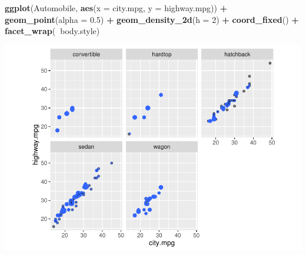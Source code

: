 \documentclass[]{article}
\newenvironment{Shaded}{\begin{snugshade}}{\end{snugshade}}
\newcommand{\KeywordTok}[1]{\textcolor[rgb]{0.13,0.29,0.53}{\textbf{#1}}}
\newcommand{\DataTypeTok}[1]{\textcolor[rgb]{0.13,0.29,0.53}{#1}}
\newcommand{\DecValTok}[1]{\textcolor[rgb]{0.00,0.00,0.81}{#1}}
\newcommand{\FloatTok}[1]{\textcolor[rgb]{0.00,0.00,0.81}{#1}}
\newcommand{\StringTok}[1]{\textcolor[rgb]{0.31,0.60,0.02}{#1}}
\newcommand{\CommentTok}[1]{\textcolor[rgb]{0.56,0.35,0.01}{\textit{#1}}}
\newcommand{\ControlFlowTok}[1]{\textcolor[rgb]{0.13,0.29,0.53}{\textbf{#1}}}
\newcommand{\OperatorTok}[1]{\textcolor[rgb]{0.81,0.36,0.00}{\textbf{#1}}}
\newcommand{\NormalTok}[1]{#1}
\begin{document}
\begin{Shaded}
\begin{Highlighting}[]
\KeywordTok{ggplot}\NormalTok{(Automobile, }\KeywordTok{aes}\NormalTok{(}\DataTypeTok{x =}\NormalTok{ city.mpg, }\DataTypeTok{y =}\NormalTok{ highway.mpg)) }\OperatorTok{+}\StringTok{ }\KeywordTok{geom_point}\NormalTok{(}\DataTypeTok{alpha =} \FloatTok{0.5}\NormalTok{) }\OperatorTok{+}\StringTok{ }
\StringTok{    }\KeywordTok{geom_density_2d}\NormalTok{(}\DataTypeTok{h =} \DecValTok{2}\NormalTok{) }\OperatorTok{+}\StringTok{ }\KeywordTok{coord_fixed}\NormalTok{() }\OperatorTok{+}\StringTok{ }\KeywordTok{facet_wrap}\NormalTok{(}\OperatorTok{~}\NormalTok{body.style)}
\end{Highlighting}
\end{Shaded}

\begin{center}\includegraphics{project2_files/figure-latex/unnamed-chunk-1-2} \end{center}

\begin{Shaded}
\end{Shaded}
\end{document}
